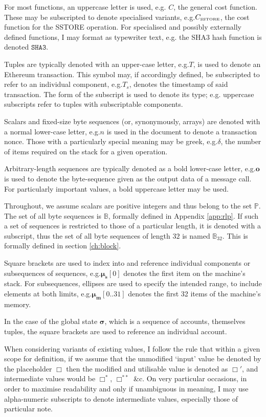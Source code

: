 \documentclass[9pt,oneside]{amsart}
\makeatletter
\newcommand*\eg{e.g.\@\xspace}
\makeatother
\begin{document}
\begin{multicols}{2}
For most functions, an uppercase letter is used, e.g. $C$, the general cost function. These may be subscripted to denote specialised variants, \eg $C_\text{\tiny SSTORE}$, the cost function for the {\tiny SSTORE} operation. For specialised and possibly externally defined functions, I may format as typewriter text, \eg the SHA3 hash function is denoted $\texttt{SHA3}$.

Tuples are typically denoted with an upper-case letter, \eg $T$, is used to denote an Ethereum transaction. This symbol may, if accordingly defined, be subscripted to refer to an individual component, \eg $T_s$, denotes the timestamp of said transaction. The form of the subscript is used to denote its type; \eg uppercase subscripts refer to tuples with subscriptable components.

Scalars and fixed-size byte sequences (or, synonymously, arrays) are denoted with a normal lower-case letter, \eg $n$ is used in the document to denote a transaction nonce. Those with a particularly special meaning may be greek, \eg $\delta$, the number of items required on the stack for a given operation.

Arbitrary-length sequences are typically denoted as a bold lower-case letter, \eg $\mathbf{o}$ is used to denote the byte-sequence given as the output data of a message call. For particularly important values, a bold uppercase letter may be used.

Throughout, we assume scalars are positive integers and thus belong to the set $\mathbb{P}$. The set of all byte sequences is $\mathbb{B}$, formally defined in Appendix \ref{app:rlp}. If such a set of sequences is restricted to those of a particular length, it is denoted with a subscript, thus the set of all byte sequences of length $32$ is named $\mathbb{B}_{32}$. This is formally defined in section \ref{ch:block}.

Square brackets are used to index into and reference individual components or subsequences of sequences, \eg $\boldsymbol{\mu}_\mathbf{s}[0]$ denotes the first item on the machine's stack. For subsequences, ellipses are used to specify the intended range, to include elements at both limits, \eg $\boldsymbol{\mu}_\mathbf{m}[0..31]$ denotes the first 32 items of the machine's memory.

In the case of the global state $\boldsymbol{\sigma}$, which is a sequence of accounts, themselves tuples, the square brackets are used to reference an individual account.

When considering variants of existing values, I follow the rule that within a given scope for definition, if we assume that the unmodified `input' value be denoted by the placeholder $\Box$ then the modified and utilisable value is denoted as $\Box'$, and intermediate values would be $\Box^*$,  $\Box^{**}$ \&c. On very particular occasions, in order to maximise readability and only if unambiguous in meaning, I may use alpha-numeric subscripts to denote intermediate values, especially those of particular note.


\end{multicols}
\end{document}
